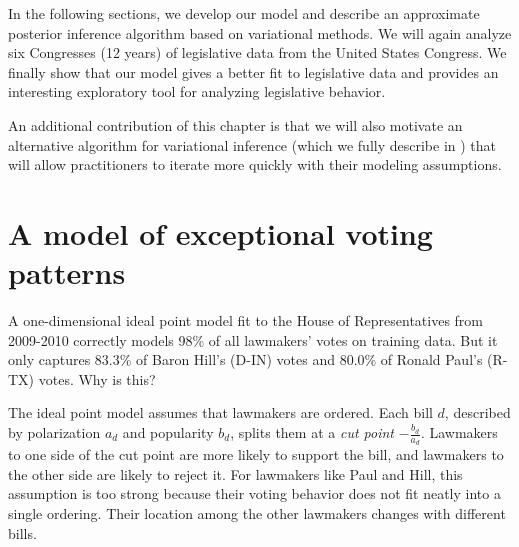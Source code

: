 
In the following sections, we develop our model and describe an
approximate posterior inference algorithm based on variational
methods.  We will again analyze six Congresses (12 years) of
legislative data from the United States Congress.  We finally show
that our model gives a better fit to legislative data and provides an
interesting exploratory tool for analyzing legislative behavior.

An additional contribution of this chapter is that we will also
motivate an alternative algorithm for variational inference (which we
fully describe in ) that
will allow practitioners to iterate more quickly with their modeling
assumptions.

\section{A model of exceptional voting patterns}
\label{sec:exceptional_model}

A one-dimensional ideal point model fit to the House of
Representatives from 2009-2010 correctly models 98\% of all lawmakers'
votes on training data. But it only captures 83.3\% of Baron Hill's
(D-IN) votes and 80.0\% of Ronald Paul's (R-TX) votes.  Why is this?

The ideal point model assumes that lawmakers are ordered.  Each bill $d$,
described by polarization $a_d$ and popularity $b_d$, splits them
at a \emph{cut point} $-\frac{b_d}{a_d}$.  Lawmakers to one side of
the cut point are more likely to support the bill, and lawmakers to
the other side are likely to reject it.  For lawmakers like Paul and
Hill, this assumption is too strong because their voting behavior does
not fit neatly into a single ordering.  Their location among the other
lawmakers changes with different bills.

